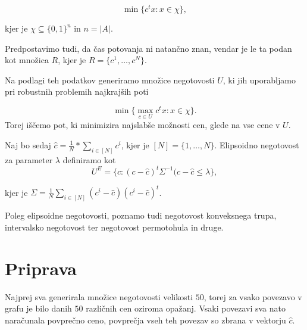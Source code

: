 \documentclass[a4paper, 12 pt]{article}
\theoremstyle{definition} %
\theoremstyle{plain} %
\theoremstyle{definition}
\begin{document}
\begin{equation*}
\min \{c^t x : x \in \chi \},
\end{equation*}

kjer je $\chi \subseteq \{0,1\}^n$ in $n = |A|$.\newline

Predpostavimo tudi, da čas potovanja ni natančno znan, vendar je le ta podan kot množica $R$, kjer je $R = \{c^1, \dots, c^N \}$.\newline

Na podlagi teh podatkov generiramo množice negotovosti $U$, ki jih uporabljamo pri robustnih problemih najkrajših poti

\begin{equation*}
\min \{\max \limits_{c \in U} c^t x : x \in \chi \}.
\end{equation*}
 Torej iščemo pot, ki minimizira najslabše možnosti cen, glede na vse cene v $U$.

\bigskip

Naj bo sedaj $\hat{c} = \frac{1}{N} * \sum_{i \in [N]} c^i $, kjer je $[N] = \{1, \dots , N \}$. Elipsoidno negotovost za parameter $\lambda$ definiramo kot
\begin{equation*}
U^E = \{c: (c - \hat{c})^t \Sigma ^{-1} (c - \hat{c}	\le \lambda \},
\end{equation*}

kjer je $\Sigma = \frac{1}{N} \sum_{i \in [N]} (c^i -\hat{c}) (c^i -\hat{c})^t$.

\bigskip
Poleg elipsoidne negotovosti, poznamo tudi negotovost konveksnega trupa, intervalsko negotovost ter negotovost permotohula in druge. 
\pagebreak


\section{Priprava}

Najprej sva generirala množice negotovosti velikosti $50$, torej za vsako povezavo v grafu je bilo danih $50$ različnih cen oziroma opažanj. Vsaki povezavi sva nato naračunala povprečno ceno, povprečja vseh teh povezav so zbrana v vektorju $\hat{c}$.\newline
\end{document}
